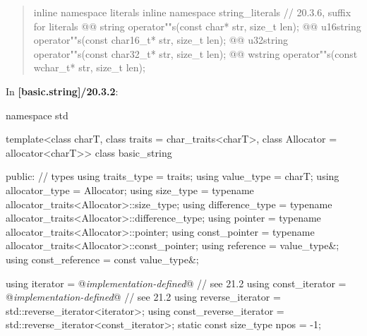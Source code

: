 \documentclass{wg21}
\begin{document}
\begin{quote}
\begin{codeblock}
{  inline namespace literals {
  inline namespace string_literals {
    // 20.3.6, suffix for  literals
    @@ string    operator""s(const char* str, size_t len);
    @@ u16string operator""s(const char16_t* str, size_t len);
    @@ u32string operator""s(const char32_t* str, size_t len);
    @@ wstring   operator""s(const wchar_t* str, size_t len);
  }
  }
}
\end{codeblock}
\end{quote}

In \textbf{[basic.string]/20.3.2}:
\begin{codeblock}
namespace std {
  template<class charT, class traits = char_traits<charT>,
           class Allocator = allocator<charT>>
  class basic_string {
  public:
    // types
    using traits_type            = traits;
    using value_type             = charT;
    using allocator_type         = Allocator;
    using size_type              = typename allocator_traits<Allocator>::size_type;
    using difference_type        = typename allocator_traits<Allocator>::difference_type;
    using pointer                = typename allocator_traits<Allocator>::pointer;
    using const_pointer          = typename allocator_traits<Allocator>::const_pointer;
    using reference              = value_type&;
    using const_reference        = const value_type&;

    using iterator               = @\textit{implementation-defined}@ // see 21.2
    using const_iterator         = @\textit{implementation-defined}@ // see 21.2
    using reverse_iterator       = std::reverse_iterator<iterator>;
    using const_reverse_iterator = std::reverse_iterator<const_iterator>;
    static const size_type npos  = -1;

}}
\end{codeblock}
\end{document}

